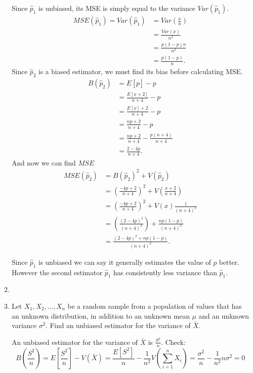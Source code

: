 \documentclass{article}
\begin{document}
\begin{enumerate}
Since $\hat{p}_1$ is unbiased, its MSE is simply equal to the variance $Var(\hat{p}_1)$.
\begin{align*}
    MSE(\hat{p}_1)=Var(\hat{p}_1)&= Var\left( \frac{x}{n} \right)  \\
            &= \frac{Var(x)}{n^2} \\
            &= \frac{p(1-p)n}{n^2} \\
            &= \frac{p(1-p)}{n} 
.\end{align*}
Since $\hat{p}_2$ is a biased estimator, we must find its bias before calculating MSE.
\begin{align*}
    B(\hat{p}_2)&= E[\hat{p}]-p \\
                &= \frac{E[x+2]}{n+4} -p\\
                &= \frac{E[x]+2}{n+4} -p\\
                &= \frac{np+2}{n+4} -p\\
                &= \frac{np+2}{n+4}-\frac{p(n+4)}{n+4} \\
                &= \frac{2-4p}{n+4} 
.\end{align*}
And now we can find $MSE$
\begin{align*}
    MSE(\hat{p}_2)&= B(\hat{p}_2)^2+V(\hat{p}_2) \\
                &= \left(\frac{-4p+2}{n+4}\right)^2 +V\left( \frac{x+2}{n+4} \right) \\
                &= \left(\frac{-4p+2}{n+4}\right)^2 +V\left( x\right)\frac{1}{(n+4)^2} \\
                &= \left(\frac{(2-4p)^2}{(n+4)^2}\right) +\frac{np(1-p)}{(n+4)^2}\\
                &= \frac{(2-4p)^2+np(1-p)}{(n+4)^2}
.\end{align*}

Since $\hat{p}_1$ is unbiased we can say it generally estimates the value of $p$ better. However
the second estimator $\hat{p}_1$ has consistently less variance than $\hat{p}_1$.

\item

\item  Let $X_1, X_2, . . . , X_n$ be a random sample from a population of values that has an unknown distribution, in addition to an unknown mean $\mu$ and an unknown variance $\sigma^2$. Find an unbiased estimator for the variance of $\bar{X}$.

    An unbiased estimator for the variance of $\bar{X}$ is $\frac{S^2}{n}$. Check:
    $$B(\frac{S^2}{n})=E\left[\frac{S^2}{n}\right]-V\left( \bar{X} \right)= \frac{E[S^2]}{n}-\frac{1}{n^2}V\left( \sum_{i=1}^{n} X_i \right) =\frac{\sigma^2}{n}-\frac{1}{n^2}n\sigma^2=0$$


\end{enumerate}
\end{document}
